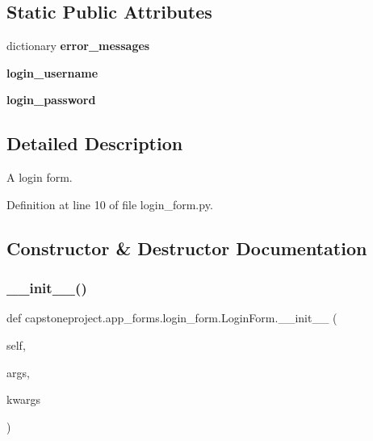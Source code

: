 \subsection*{Static Public Attributes}
\begin{DoxyCompactItemize}
\item 
dictionary {\bfseries error\+\_\+messages}
\item 
{\bfseries login\+\_\+username}
\item 
{\bfseries login\+\_\+password}
\end{DoxyCompactItemize}


\subsection{Detailed Description}
\begin{DoxyVerb}A login form.
\end{DoxyVerb}
 

Definition at line 10 of file login\+\_\+form.\+py.



\subsection{Constructor \& Destructor Documentation}
\mbox{\label{classcapstoneproject_1_1app__forms_1_1login__form_1_1_login_form_a1518cef9040021afd7b25e75431faa85}} 
\subsubsection{\texorpdfstring{\+\_\+\+\_\+init\+\_\+\+\_\+()}{\_\_init\_\_()}}
{\footnotesize\ttfamily def capstoneproject.\+app\+\_\+forms.\+login\+\_\+form.\+Login\+Form.\+\_\+\+\_\+init\+\_\+\+\_\+ (\begin{DoxyParamCaption}\item[{}]{self,  }\item[{}]{args,  }\item[{}]{kwargs }\end{DoxyParamCaption})}

